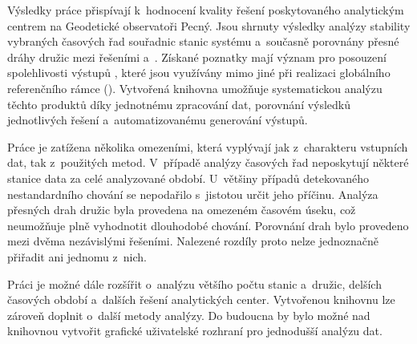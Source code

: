 Výsledky práce přispívají k~hodnocení kvality řešení poskytovaného analytickým centrem na Geodetické observatoři Pecný. Jsou shrnuty výsledky analýzy stability vybraných časových řad souřadnic stanic systému  a~současně porovnány přesné dráhy družic mezi řešeními  a~. Získané poznatky mají význam pro posouzení spolehlivosti výstupů , které jsou využívány mimo jiné při realizaci globálního referenčního rámce (). Vytvořená knihovna umožňuje systema\-tickou analýzu těchto produktů díky jednotnému zpracování dat, porovnání výsledků jednotlivých řešení a~automatizovanému generování výstupů.

Práce je zatížena několika omezeními, která vyplývají jak z~charakteru vstupních dat, tak z~použitých metod. V~případě analýzy časových řad neposkytují některé stanice data za celé analyzované období. U~většiny případů detekovaného nestandardního chování se nepodařilo s~jistotou určit jeho příčinu. Analýza přesných drah družic byla provedena na omezeném časovém úseku, což neumožňuje plně vyhodnotit dlouhodobé chování. Porovnání drah bylo provedeno mezi dvěma nezávislými řešeními. Nalezené rozdíly proto nelze jednoznačně přiřadit ani jednomu z~nich.

Práci je možné dále rozšířit o~analýzu většího počtu stanic a~družic, delších časových období a~dalších řešení analytických center. Vytvořenou knihovnu lze zároveň doplnit o~další metody analýzy. Do budoucna by bylo možné nad knihovnou vytvořit grafické uživatelské rozhraní pro jednodušší analýzu dat.